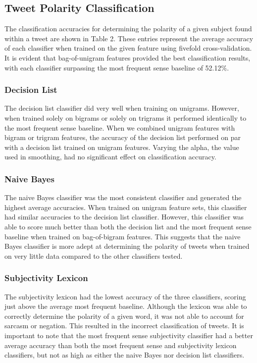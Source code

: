 \documentclass[11pt]{article}
\begin{document}
\subsection{Tweet Polarity Classification}
The classification accuracies for determining the polarity of a given subject found within a tweet are shown in Table 2. These entries represent the average accuracy of each classifier when trained on the given feature using fivefold cross-validation. It is evident that bag-of-unigram features provided the best classification results, with each classifier surpassing the most frequent sense baseline of 52.12\%.

\subsubsection*{Decision List}
The decision list classifier did very well when training on unigrams. However, when trained solely on bigrams or solely on trigrams it performed identically to the most frequent sense baseline. When we combined unigram features with bigram or trigram features, the accuracy of the decision list performed on par with a decision list trained on unigram features. Varying the alpha, the value used in smoothing, had no significant effect on classification accuracy. 

\subsubsection*{Naive Bayes}
The naive Bayes classifier was the most consistent classifier and generated the highest average accuracies. When trained on unigram feature sets, this classifier had similar accuracies to the decision list classifier. However, this classifier was able to score much better than both the decision list and the most frequent sense baseline when trained on bag-of-bigram features. This suggests that the naive Bayes classifier is more adept at determining the polarity of tweets when trained on very little data compared to the other classifiers tested.

\subsubsection*{Subjectivity Lexicon}
The subjectivity lexicon had the lowest accuracy of the three classifiers, scoring just above the average most frequent baseline. Although the lexicon was able to correctly determine the polarity of a given word, it was not able to account for sarcasm or negation. This resulted in the incorrect classification of tweets. It is important to note that the most frequent sense subjectivity classifier had a better average accuracy than both the most frequent sense and subjectivity lexicon classifiers, but not as high as either the naive Bayes nor decision list classifiers. 
\end{document}
